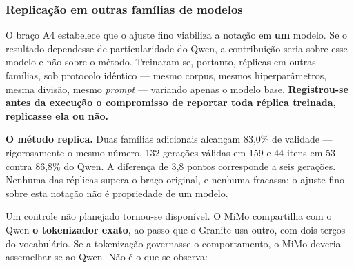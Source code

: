 \subsubsection*{Replicação em outras famílias de modelos}

O braço A4 estabelece que o ajuste fino viabiliza a notação em \textbf{um} modelo. Se o resultado dependesse de particularidade do Qwen, a contribuição seria sobre esse modelo e não sobre o método. Treinaram-se, portanto, réplicas em outras famílias, sob protocolo idêntico --- mesmo corpus, mesmos hiperparâmetros, mesma divisão, mesmo \textit{prompt} --- variando apenas o modelo base. \textbf{Registrou-se antes da execução o compromisso de reportar toda réplica treinada, replicasse ela ou não.}

\begin{table}[h!]
\end{table}

\textbf{O método replica.} Duas famílias adicionais alcançam 83,0\% de validade --- rigorosamente o mesmo número, 132 gerações válidas em 159 e 44 itens em 53 --- contra 86,8\% do Qwen. A diferença de 3,8 pontos corresponde a seis gerações. Nenhuma das réplicas supera o braço original, e nenhuma fracassa: o ajuste fino sobre esta notação não é propriedade de um modelo.

Um controle não planejado tornou-se disponível. O MiMo compartilha com o Qwen \textbf{o tokenizador exato}, ao passo que o Granite usa outro, com dois terços do vocabulário. Se a tokenização governasse o comportamento, o MiMo deveria assemelhar-se ao Qwen. Não é o que se observa:

